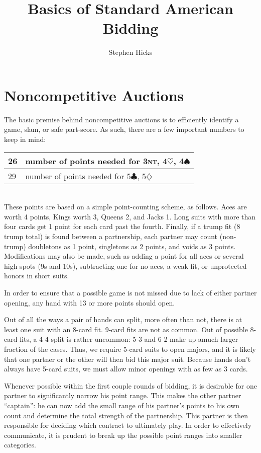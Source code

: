\documentclass[11pt]{article}
\title{Basics of Standard American Bidding}
\author{Stephen Hicks}
\def\C{$\clubsuit$}
\def\D{$\diamondsuit$}
\def\H{$\heartsuit$}
\def\S{$\spadesuit$}
\def\NT{\textsc{nt}}
\begin{document}
\maketitle
\section{Noncompetitive Auctions}
The basic premise behind noncompetitive auctions is to
efficiently identify a game, slam, or safe part-score.
As such, there are a few important numbers to keep in mind:\\

\begin{tabular}{|l|l|}\hline
26 & number of points needed for 3\NT, 4\H, 4\S\\\hline
29 & number of points needed for 5\C, 5\D\\\hline
\end{tabular}\\

These points are based on a simple point-counting scheme, as follows.
Aces are worth 4 points, Kings worth 3, Queens 2, and Jacks 1.  Long
suits with more than four cards get 1 point for each card past the
fourth.  Finally, if a trump fit (8 trump total) is found between a
partnership, each partner may count (non-trump) doubletons as 1 point,
singletons as 2 points, and voids as 3 points.  Modifications may also
be made, such as adding a point for all aces or several high spots (9s
and 10s), subtracting one for no aces, a weak fit, or unprotected
honors in short suits.

In order to ensure that a possible game is not missed due to
lack of either partner opening, any hand with 13 or more points
should open.

Out of all the ways a pair of hands can split, more often than not,
there is at least one suit with an 8-card fit.  9-card fits are not as
common.  Out of possible 8-card fits, a 4-4 split is rather uncommon:
5-3 and 6-2 make up amuch larger fraction of the cases.  Thus, we
require 5-card suits to open majors, and it is likely that one partner
or the other will then bid this major suit.  Because hands don't
always have 5-card suits, we must allow minor openings with as few as
3 cards.

Whenever possible within the first couple rounds of bidding, it
is desirable for one partner to significantly narrow his point
range.  This makes the other partner ``captain'': he can now add
the small range of his partner's points to his own count and determine
the total strength of the partnership.  This partner is then responsible
for deciding which contract to ultimately play.  In order to effectively
communicate, it is prudent to break up the possible point ranges into
smaller categories.
\end{document}
